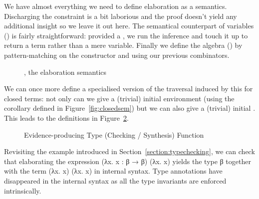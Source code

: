 We have almost everything we need to define elaboration as a semantics. Discharging
the  constraint is a bit laborious and the proof doesn't
yield any additional insight so we leave it out here. The semantical counterpart of
variables () is fairly straightforward: provided a , we run the
inference and touch it up to return a term rather than a mere variable. Finally we
define the algebra () by pattern-matching on the constructor and using our
previous combinators.

\begin{figure}[h]
  \caption{, the elaboration semantics\label{defn:Elaborate}}
\end{figure}

We can once more define a specialised version of the traversal induced by this
 for closed terms: not only can we give a (trivial) initial
environment (using the  corollary defined in Figure~\ref{fig:closedsem})
but we can also give a (trivial) initial . This leads to the
definitions in Figure~\ref{fig:typedelaboration}.

\begin{figure}[h]
\begin{minipage}{0.45\textwidth}
\end{minipage}\hfill
\begin{minipage}{0.45\textwidth}
\end{minipage}
\caption{Evidence-producing Type (Checking / Synthesis) Function}
\label{fig:typedelaboration}
\end{figure}

Revisiting the example introduced in Section~\ref{section:typechecking},
we can check that elaborating the expression {(λx. x : β → β) (λx. x)}
yields the type {β} together with the term {(λx. x) (λx. x)} in internal
syntax. Type annotations have disappeared in the internal syntax as all
the type invariants are enforced intrinsically.

\begin{figure}[h]
\end{figure}
